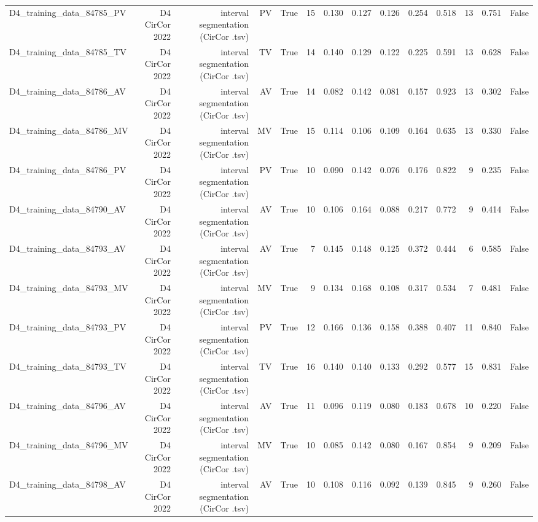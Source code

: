 \begin{table}[htbp]
\begin{tabular}{lrrrrrrrrrrrrr}
    D4\_training\_data\_84785\_PV & D4 CirCor 2022 & interval segmentation (CirCor .tsv) & PV & True & 15 & 0.130 & 0.127 & 0.126 & 0.254 & 0.518 & 13 & 0.751 & False \\
    D4\_training\_data\_84785\_TV & D4 CirCor 2022 & interval segmentation (CirCor .tsv) & TV & True & 14 & 0.140 & 0.129 & 0.122 & 0.225 & 0.591 & 13 & 0.628 & False \\
    D4\_training\_data\_84786\_AV & D4 CirCor 2022 & interval segmentation (CirCor .tsv) & AV & True & 14 & 0.082 & 0.142 & 0.081 & 0.157 & 0.923 & 13 & 0.302 & False \\
    D4\_training\_data\_84786\_MV & D4 CirCor 2022 & interval segmentation (CirCor .tsv) & MV & True & 15 & 0.114 & 0.106 & 0.109 & 0.164 & 0.635 & 13 & 0.330 & False \\
    D4\_training\_data\_84786\_PV & D4 CirCor 2022 & interval segmentation (CirCor .tsv) & PV & True & 10 & 0.090 & 0.142 & 0.076 & 0.176 & 0.822 & 9 & 0.235 & False \\
    D4\_training\_data\_84790\_AV & D4 CirCor 2022 & interval segmentation (CirCor .tsv) & AV & True & 10 & 0.106 & 0.164 & 0.088 & 0.217 & 0.772 & 9 & 0.414 & False \\
    D4\_training\_data\_84793\_AV & D4 CirCor 2022 & interval segmentation (CirCor .tsv) & AV & True & 7 & 0.145 & 0.148 & 0.125 & 0.372 & 0.444 & 6 & 0.585 & False \\
    D4\_training\_data\_84793\_MV & D4 CirCor 2022 & interval segmentation (CirCor .tsv) & MV & True & 9 & 0.134 & 0.168 & 0.108 & 0.317 & 0.534 & 7 & 0.481 & False \\
    D4\_training\_data\_84793\_PV & D4 CirCor 2022 & interval segmentation (CirCor .tsv) & PV & True & 12 & 0.166 & 0.136 & 0.158 & 0.388 & 0.407 & 11 & 0.840 & False \\
    D4\_training\_data\_84793\_TV & D4 CirCor 2022 & interval segmentation (CirCor .tsv) & TV & True & 16 & 0.140 & 0.140 & 0.133 & 0.292 & 0.577 & 15 & 0.831 & False \\
    D4\_training\_data\_84796\_AV & D4 CirCor 2022 & interval segmentation (CirCor .tsv) & AV & True & 11 & 0.096 & 0.119 & 0.080 & 0.183 & 0.678 & 10 & 0.220 & False \\
    D4\_training\_data\_84796\_MV & D4 CirCor 2022 & interval segmentation (CirCor .tsv) & MV & True & 10 & 0.085 & 0.142 & 0.080 & 0.167 & 0.854 & 9 & 0.209 & False \\
    D4\_training\_data\_84798\_AV & D4 CirCor 2022 & interval segmentation (CirCor .tsv) & AV & True & 10 & 0.108 & 0.116 & 0.092 & 0.139 & 0.845 & 9 & 0.260 & False \\

\end{tabular}
\end{table}
